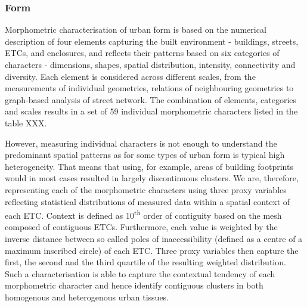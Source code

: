 \subsubsection*{Form}
Morphometric characterisation of urban form is based on the numerical description
of four elements capturing the built environment - buildings, streets, ETCs, and
enclosures, and reflects their patterns based on six categories of characters - dimensions, shapes, spatial
distribution, intensity, connectivity and diversity\cite{fleischmann2020a}. Each element is considered across
different scales, from the measurements of individual geometries, relations of
neighbouring geometries to graph-based analysis of street network. The combination of
elements, categories and scales results in a set of 59 individual morphometric
characters listed in the table XXX.

However, measuring individual characters is not enough to understand the predominant
spatial patterns as for some types of urban form is typical high heterogeneity. That
means that using, for example, areas of building footprints would in most cases resulted
in largely discontinuous clusters. We are, therefore, representing each of the
morphometric characters using three proxy variables reflecting statistical distributions
of measured data within a spatial context of each ETC. Context is defined as
10\textsuperscript{th}
order of contiguity based on the mesh composed of contiguous ETCs. Furthermore, each
value is weighted by the inverse distance between so called poles of inaccessibility
(defined as a centre of a maximum inscribed circle) of each ETC. Three proxy variables
then capture the first, the second and the third quartile of the resulting weighted
distribution. Such a characterisation is able to capture the contextual tendency of each
morphometric character and hence identify contiguous clusters in both homogenous and
heterogenous urban tissues.

